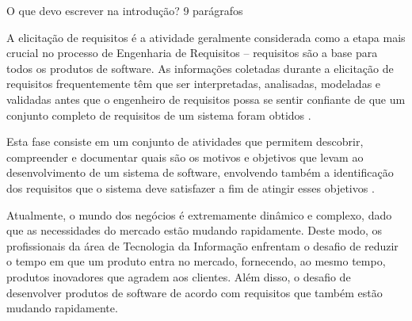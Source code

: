   \label{introducao}





O que devo escrever na introdução? 9 parágrafos 



A elicitação de requisitos é a atividade geralmente considerada como a etapa mais crucial no processo de Engenharia de Requisitos -- requisitos são a base para todos os produtos de software. As informações coletadas durante a elicitação de requisitos frequentemente têm que ser interpretadas, analisadas, modeladas e validadas antes que o engenheiro de requisitos possa se sentir confiante de que um conjunto completo de requisitos de um sistema foram obtidos \cite{EPICUREAN}.
 
Esta fase consiste em um conjunto de atividades que permitem descobrir, compreender e documentar quais são os motivos e objetivos que levam ao desenvolvimento de um sistema de software, envolvendo também a identificação dos requisitos que o sistema deve satisfazer a fim de atingir esses objetivos \cite{EPICUREAN}.
 
Atualmente, o mundo dos negócios é extremamente dinâmico e complexo, dado que as necessidades do mercado estão mudando rapidamente. Deste modo, os profissionais da área de Tecnologia da Informação enfrentam o desafio de reduzir o tempo em que um produto entra no mercado, fornecendo, ao mesmo tempo, produtos inovadores que agradem aos clientes. Além disso, o desafio de desenvolver produtos de software de acordo com requisitos que também estão mudando rapidamente.

